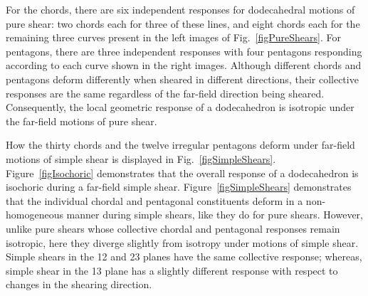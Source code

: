 For the chords, there are six independent responses for dodecahedral motions of pure shear: two chords each for three of these lines, and eight chords each for the remaining three curves present in the left images of Fig.~\ref{figPureShears}.  For pentagons, there are three independent responses with four pentagons responding according to each curve shown in the right images.  Although different chords and pentagons deform differently when sheared in different directions, their collective responses are the same regardless of the far-field direction being sheared.  Consequently, the local geometric response of a dodecahedron is isotropic under the far-field motions of pure shear.  

How the thirty chords and the twelve irregular pentagons deform under far-field motions of simple shear is displayed in Fig.~\ref{figSimpleShears}.  Figure~\ref{figIsochoric} demonstrates that the overall response of a dodecahedron is isochoric during a far-field simple shear. Figure~\ref{figSimpleShears} demonstrates that the individual chordal and pentagonal constituents deform in a non-homogeneous manner during simple shears, like they do for pure shears.  However, unlike pure shears whose collective chordal and pentagonal responses remain isotropic, here they diverge slightly from isotropy under motions of simple shear.  Simple shears in the 12 and 23 planes have the same collective response; whereas, simple shear in the 13 plane has a slightly different response with respect to changes in the shearing direction.  

